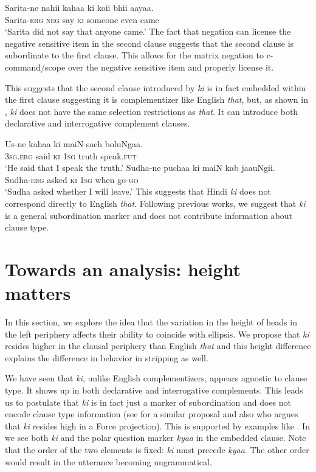 \documentclass[output=paper]{langscibook}
\begin{document}
\ea \label{maex22}
    \gll Sarita-ne nahii kahaa ki koii bhii aayaa.\\
    Sarita-\textsc{erg} \textsc{neg} say \textsc{ki} someone even came\\
    \glt `Sarita did not say that anyone came.'
\z 
The fact that negation can license the negative sensitive item in the second clause suggests that the second clause is subordinate to the first clause. This allows for the matrix negation to c-command/scope over the negative sensitive item and properly license it.

This suggests that the second clause introduced by \emph{ki} is in fact embedded within the first clause suggesting it is complementizer like English \emph{that}, but, as shown in , \emph{ki} does not have the same selection restrictions as \emph{that}. It can introduce both declarative  and interrogative  complement clauses.

\ea \label{maex23}
    \ea \label{maex23:a}
        \gll Us-ne kahaa ki maiN sach boluNgaa.\\
        \textsc{3sg.erg} said \textsc{ki} \textsc{1sg} truth speak.\textsc{fut}\\
        \glt `He said that I speak the truth.'
    \ex \label{maex23:b}
        \gll Sudha-ne puchaa ki maiN kab jaauNgii.\\
        Sudha-\textsc{erg} asked \textsc{ki} \textsc{1sg} when go-\textsc{go}\\
        \glt `Sudha asked whether I will leave.'
    \z 
\z 
This suggests that Hindi \emph{ki} does not correspond directly to English \emph{that}. Following previous works, we suggest that \emph{ki} is a general subordination marker and does not contribute information about clause type. 

\section{Towards an analysis: height matters}\label{mamasect3}
In this section, we explore the idea that the variation in the height of heads in the left periphery affects their ability to coincide with ellipsis. We propose that \emph{ki} resides higher in the clausal periphery than English \emph{that} and this height difference explains the difference in behavior in stripping as well.

We have seen that \emph{ki}, unlike English complementizers, appears agnostic to clause type. It shows up in both declarative and interrogative complements. This leads us to postulate that \emph{ki} is in fact just a marker of subordination and does not encode clause type information (see \citealt{bhatt91} for a similar proposal and also \citealt{davison03} who argues that \emph{ki} resides high in a Force projection). This is supported by examples like . In  we see both \emph{ki} and the polar question marker \emph{kyaa} in the embedded clause. Note that the order of the two elements is fixed: \emph{ki} must precede \emph{kyaa}. The other order would result in the utterance becoming ungrammatical.
\end{document}
